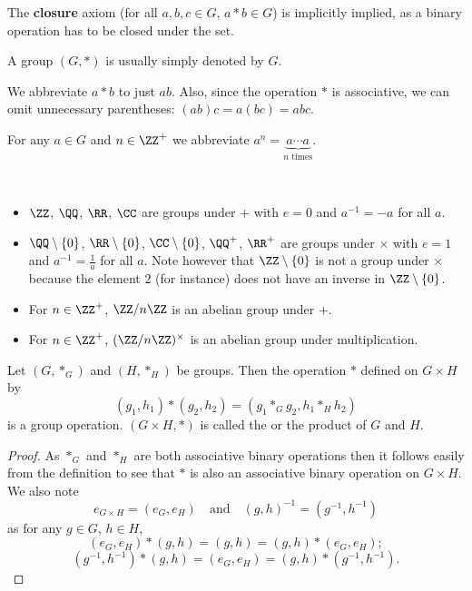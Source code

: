 \begin{remark}
The \textbf{closure} axiom (for all $a,b,c \in G$, $a\ast b\in G$) is implicitly implied, as a binary operation has to be closed under the set.
\end{remark}

\begin{notation}
A group $(G,\ast)$ is usually simply denoted by $G$.
\end{notation}

\begin{notation}
We abbreviate $a \ast b$ to just $ab$. Also, since the operation $\ast$ is associative, we can omit unnecessary parentheses: $(ab)c = a(bc) = abc$.
\end{notation}

\begin{notation}
For any $a\in G$ and $n\in\ZZ^+$ we abbreviate $a^n=\underbrace{a\cdots a}_{n\text{ times}}$.
\end{notation}

\begin{example} \
\begin{itemize}
\item $\ZZ$, $\QQ$, $\RR$, $\CC$ are groups under $+$ with $e=0$ and $a^{-1}=-a$ for all $a$.
\item $\QQ\setminus\{0\}$, $\RR\setminus\{0\}$, $\CC\setminus\{0\}$, $\QQ^+$, $\RR^+$ are groups under $\times$ with $e=1$ and $a^{-1}=\frac{1}{a}$ for all $a$. Note however that $\ZZ\setminus\{0\}$ is not a group under $\times$ because the element 2 (for instance) does not have an inverse in $\ZZ\setminus\{0\}$.
\item For $n\in\ZZ^+$, $\ZZ/n\ZZ$ is an abelian group under $+$.
\item For $n\in\ZZ^+$, $(\ZZ/n\ZZ)^\times$ is an abelian group under multiplication.
\end{itemize}
\end{example}

\begin{definition}
Let $(G,\ast_G)$ and $(H,\ast_H)$ be groups. Then the operation $\ast$ defined on $G\times H$ by
\[ (g_1,h_1)\ast(g_2,h_2)=(g_1\ast_G g_2,h_1\ast_H h_2) \]
is a group operation. $(G \times H, \ast)$ is called the  or the product of $G$ and $H$.
\end{definition}
    
\begin{proof}
As $\ast_G$ and $\ast_H$ are both associative binary operations then it follows easily from the definition to see that $\ast$ is also an associative binary operation on $G \times H$. We also note
\[ e_{G\times H}=(e_G,e_H) \quad \text{and} \quad (g,h)^{-1}=(g^{-1},h^{-1}) \]
as for any $g \in G$, $h \in H$,
\[ (e_G,e_H)\ast(g,h)=(g,h)=(g,h)\ast(e_G,e_H); \]
\[ (g^{-1},h^{-1})\ast(g,h)=(e_G,e_H)=(g,h)\ast(g^{-1},h^{-1}). \]
\end{proof}

